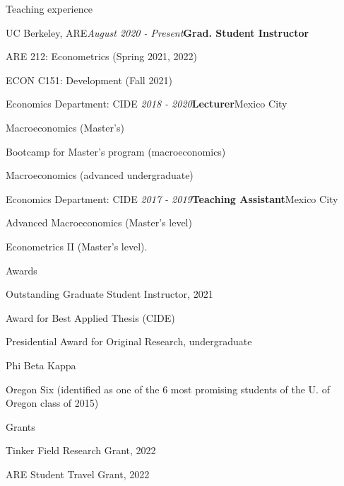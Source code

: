 \documentclass{resume} %
\begin{document}
\begin{rSection}{Teaching experience}

\begin{rSubsection}{UC Berkeley, ARE}{\textit{August 2020 - Present}}{\textbf{Grad. Student Instructor}}{}
\item ARE 212: Econometrics (Spring 2021, 2022)
\item ECON C151: Development (Fall 2021)
\end{rSubsection}

\begin{rSubsection}{Economics Department: CIDE}{\textit{ 2018 -  2020}}{\textbf{Lecturer}}{Mexico City}
\item Macroeconomics (Master's)
\item Bootcamp for Master's program (macroeconomics)
\item Macroeconomics (advanced undergraduate)
\end{rSubsection}

\begin{rSubsection}{Economics Department: CIDE}{\textit{ 2017 - 2019}}{\textbf{Teaching Assistant}}{Mexico City}
\item Advanced Macroeconomics (Master's level) 
\item Econometrics II (Master's level).
\end{rSubsection}

\end{rSection}


\begin{rSection}{Awards} \itemsep -2pt
\item Outstanding Graduate Student Instructor, 2021
\item Award for Best Applied Thesis (CIDE)
\item Presidential Award for Original Research, undergraduate
\item Phi Beta Kappa
\item Oregon Six (identified as one of the 6 most promising students of the U. of Oregon class of 2015)

\end{rSection}

\begin{rSection}{Grants} \itemsep -2pt
\item Tinker Field Research Grant, 2022
\item ARE Student Travel Grant, 2022

\end{rSection}
\end{document}
